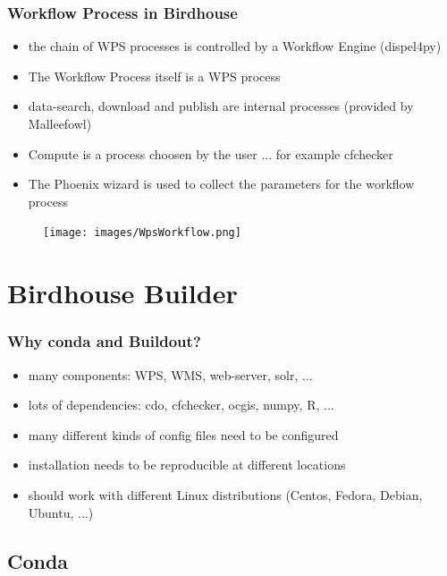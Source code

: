 \documentclass{beamer}
\begin{document}
  \begin{frame}[plain]
    \frametitle{Workflow Process in Birdhouse}
    \begin{itemize}
      \item the chain of WPS processes is controlled by a Workflow Engine (dispel4py) 
      \item The Workflow Process itself is a WPS process
      \item data-search, download and publish are internal processes (provided by Malleefowl)
      \item Compute is a process choosen by the user ... for example cfchecker
      \item The Phoenix wizard is used to collect the parameters for the workflow process
    \end{itemize}
    \begin{figure}
      \texttt{[image: images/WpsWorkflow.png]}
    \end{figure}
  \end{frame}


  \section{Birdhouse Builder}


  \begin{frame}
    \frametitle{Why conda and Buildout?}
    \begin{itemize}
      \item many components: WPS, WMS, web-server, solr, ...
      \item lots of dependencies: cdo, cfchecker, ocgis, numpy, R, ...
      \item many different kinds of config files need to be configured 
      \item installation needs to be reproducible at different locations
      \item should work with different Linux distributions (Centos, Fedora, Debian, Ubuntu, ...)
    \end{itemize}
  \end{frame}


  \subsection{Conda}
\end{document}
